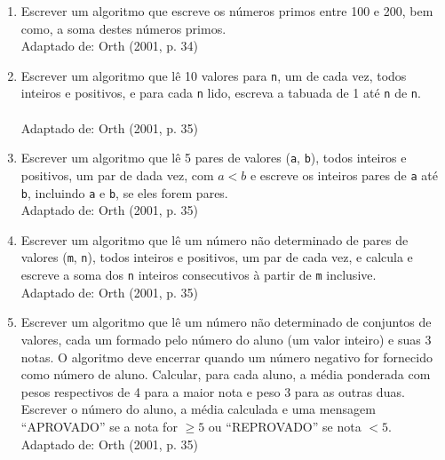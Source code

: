 \documentclass[onecolumn,a4paper,10pt]{report}
\newcommand{\+}{\, + \,}
\newcommand{\<}{\hspace*{-0.4cm}}
\begin{document}
\begin{enumerate}[1.]
\item Escrever um algoritmo que escreve os números primos entre 100 e 200, bem como, a soma destes números primos.\\
{\tiny Adaptado de: Orth (2001, p. 34)}

\item Escrever um algoritmo que lê 10 valores para \texttt{n}, um de cada vez, todos inteiros e positivos, e para cada \texttt{n} lido, escreva a tabuada de 1 até \texttt{n} de \texttt{n}.\\
\\
{\tiny Adaptado de: Orth (2001, p. 35)}

\item Escrever um algoritmo que lê 5 pares de valores (\texttt{a}, \texttt{b}), todos inteiros e positivos, um par de dada vez, com $a < b$ e escreve os inteiros pares de \texttt{a} até \texttt{b}, incluindo \texttt{a} e \texttt{b}, se eles forem pares.\\
{\tiny Adaptado de: Orth (2001, p. 35)}

\item Escrever um algoritmo que lê um número não determinado de pares de valores (\texttt{m}, \texttt{n}), todos inteiros e positivos, um par de cada vez, e calcula e escreve a soma dos \texttt{n} inteiros consecutivos à partir de \texttt{m} inclusive.\\
{\tiny Adaptado de: Orth (2001, p. 35)}

\item Escrever um algoritmo que lê um número não determinado de conjuntos de valores, cada um formado pelo número do aluno (um valor inteiro) e suas 3 notas. O algoritmo deve encerrar quando um número negativo for fornecido como número de aluno. Calcular, para cada aluno, a média ponderada com pesos respectivos de 4 para a maior nota e peso 3 para as outras duas. Escrever o número do aluno, a média calculada e uma mensagem ``APROVADO'' se a nota for $\geq 5$ ou ``REPROVADO'' se nota $< 5$.\\
{\tiny Adaptado de: Orth (2001, p. 35)}


\end{enumerate}
\end{document}
